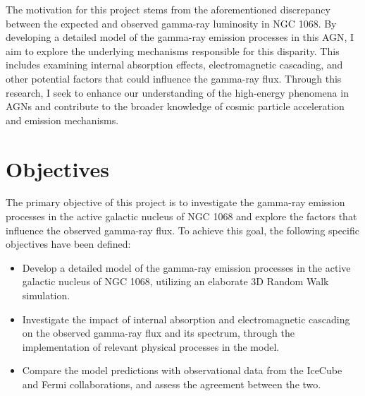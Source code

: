 The motivation for this project stems from the aforementioned discrepancy between the expected and observed gamma-ray luminosity in NGC 1068. By developing a detailed model of the gamma-ray emission processes in this AGN, I aim to explore the underlying mechanisms responsible for this disparity. This includes examining internal absorption effects, electromagnetic cascading, and other potential factors that could influence the gamma-ray flux. Through this research, I seek to enhance our understanding of the high-energy phenomena in AGNs and contribute to the broader knowledge of cosmic particle acceleration and emission mechanisms.


\section{Objectives}

The primary objective of this project is to investigate the gamma-ray emission processes in the active galactic nucleus of NGC 1068 and explore the factors that influence the observed gamma-ray flux. To achieve this goal, the following specific objectives have been defined:

\begin{itemize}
    \item Develop a detailed model of the gamma-ray emission processes in the active galactic nucleus of NGC 1068, utilizing an elaborate 3D Random Walk simulation.
    \item Investigate the impact of internal absorption and electromagnetic cascading on the observed gamma-ray flux and its spectrum, through the implementation of relevant physical processes in the model.
    \item Compare the model predictions with observational data from the IceCube and Fermi collaborations, and assess the agreement between the two. 
\end{itemize}